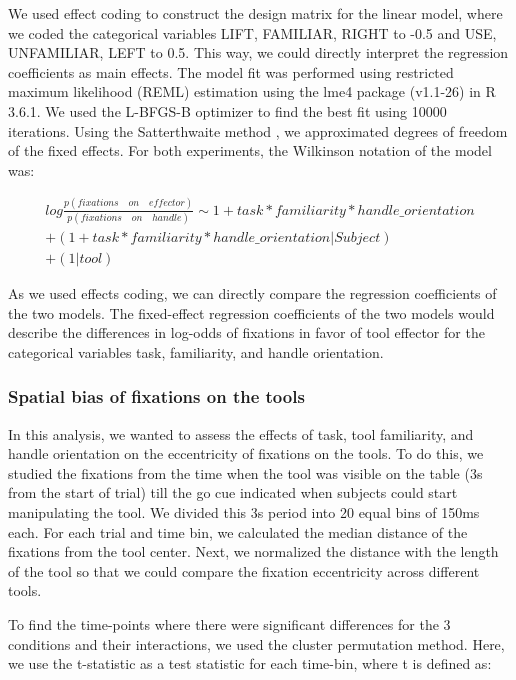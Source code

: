 We used effect coding \citep{Schad2018-av} to construct the design matrix for the linear model, where we coded the categorical variables LIFT, FAMILIAR, RIGHT to -0.5 and USE, UNFAMILIAR, LEFT to 0.5. This way, we could directly interpret the regression coefficients as main effects. The model fit was performed using restricted maximum likelihood (REML) estimation \citep{Corbeil1976-qq} using the lme4 package (v1.1-26) in R 3.6.1. We used the L-BFGS-B optimizer to find the best fit using 10000 iterations. Using the Satterthwaite method \citep{Luke2017-pz}, we approximated degrees of freedom of the fixed effects. For both experiments, the Wilkinson notation \citep{Wilkinson1973-ex} of the model was:

\begin{gather*}\label{eq:data_model}
    log \frac{p(fixations \quad on \quad effector)}{p(fixations \quad on \quad handle)} \sim 1 + task * familiarity * handle\_orientation \\ + (1 + task * familiarity * handle\_orientation | Subject) \\ + (1 | tool)
 \end{gather*}

As we used effects coding, we can directly compare the regression coefficients of the two models. The fixed-effect regression coefficients of the two models would describe the differences in log-odds of fixations in favor of tool effector for the categorical variables task, familiarity, and handle orientation.


\subsubsection{ Spatial bias of fixations on the tools}

In this analysis, we wanted to assess the effects of task, tool familiarity, and handle orientation on the eccentricity of fixations on the tools. To do this, we studied the fixations from the time when the tool was visible on the table (3s from the start of trial) till the go cue indicated when subjects could start manipulating the tool. We divided this 3s period into 20 equal bins of 150ms each. For each trial and time bin, we calculated the median distance of the fixations from the tool center. Next, we normalized the distance with the length of the tool so that we could compare the fixation eccentricity across different tools.

To find the time-points where there were significant differences for the 3 conditions and their interactions, we used the cluster permutation method. Here, we use the t-statistic as a test statistic for each time-bin, where t is defined as:


